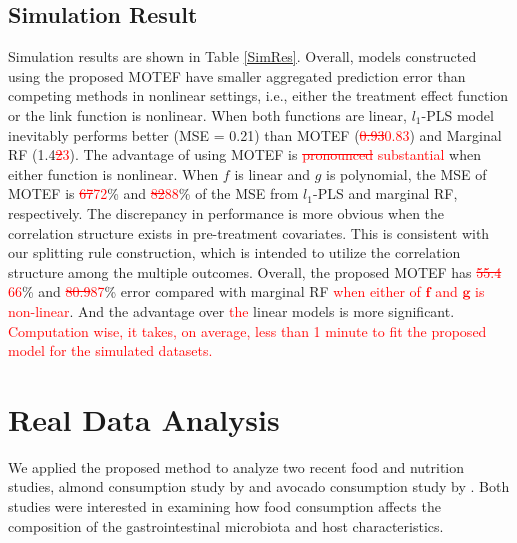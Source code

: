 \documentclass[smallextended]{svjour3}
\newcommand{\bg}[1]{\textcolor{red}{#1}}
\begin{document}
\subsection{Simulation Result}\label{3.2}
Simulation results are shown in Table \ref{SimRes}. Overall, models constructed using the proposed MOTEF have smaller aggregated prediction error than competing methods in nonlinear settings, i.e., either the treatment effect function or the link function is nonlinear. When both functions are linear, $l_1$-PLS model inevitably performs better (MSE = 0.21) than MOTEF (\bg{\st{0.93}0.83}) and Marginal RF (1.4\bg{\st{2}3}). The advantage of using MOTEF is \bg{\st{pronounced} substantial} when either function is nonlinear. When $f$ is linear and $g$ is polynomial, the MSE of MOTEF is \bg{\st{67}72}\% and \bg{\st{82}88}\% of the MSE from $l_1$-PLS and marginal RF, respectively. The discrepancy in performance is more obvious when the correlation structure exists in pre-treatment covariates. This is consistent with our splitting rule construction, which is intended to utilize the correlation structure among the multiple outcomes. Overall, the proposed MOTEF has \bg{\st{55.4} 66}\% and \bg{\st{80.9}87}\% error compared with marginal RF \bg{when either of $\bm f$ and $\bm g$ is non-linear}. And the advantage over \bg{the} linear models is more significant. \bg{Computation wise, it takes, on average, less than 1 minute to fit the proposed model for the simulated datasets. 
}

\section{Real Data Analysis}\label{realdata}
We applied the proposed method to analyze two recent food and nutrition studies, almond consumption study by \citet{holscher2018almond} and avocado consumption study by \citet{Avocado}. Both studies were interested in examining how food consumption affects the composition of the gastrointestinal microbiota and host characteristics. 
\end{document}
